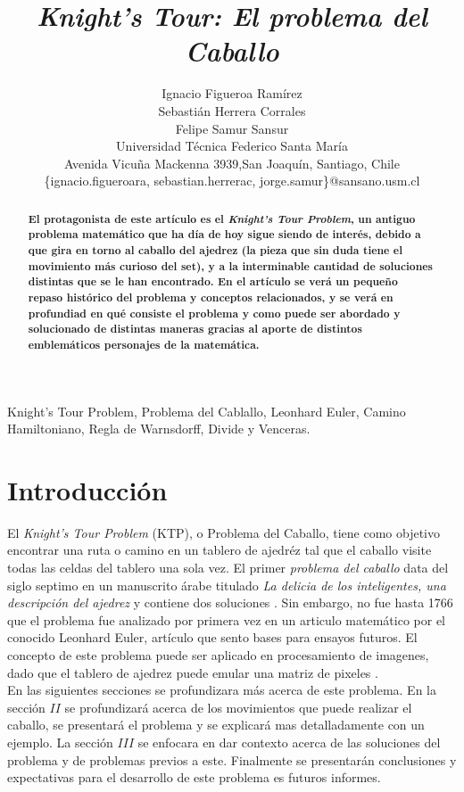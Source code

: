 \documentclass[journal, 10pt]{IEEEtran}
\begin{document}
\title{\textit{Knight's Tour:  El problema del Caballo}}
\author{Ignacio Figueroa Ram\'irez \\Sebasti\'an Herrera Corrales\\ Felipe Samur Sansur\\ Universidad T\'ecnica Federico Santa Mar\'ia \\ Avenida Vicu\~na Mackenna 3939,San Joaqu\'in, Santiago, Chile \\
\{ignacio.figueroara, sebastian.herrerac, jorge.samur\}@sansano.usm.cl}
\maketitle

\begin{abstract}
\textbf{El protagonista de este art\'iculo es el \textit{Knight's Tour Problem}, un antiguo problema matemático que ha día de hoy sigue siendo de interés, debido a que gira en torno al caballo del ajedrez (la pieza que sin duda tiene el movimiento más curioso del set), y a la interminable cantidad de soluciones distintas que se le han encontrado. En el artículo se verá un pequeño repaso histórico del problema y conceptos relacionados, y se verá en profundiad en qué consiste el problema y como puede ser abordado y solucionado de distintas maneras gracias al aporte de distintos emblemáticos personajes de la matemática. }
\end{abstract}

\begin{IEEEkeywords}
Knight's Tour Problem, Problema del Cablallo, Leonhard Euler, Camino Hamiltoniano, Regla de Warnsdorff, Divide y Venceras.
\end{IEEEkeywords}

\section{Introducci\'on}
El \textit{Knight's Tour Problem} (KTP), o Problema del Caballo, tiene como objetivo encontrar una ruta o camino en un tablero de ajedr\'ez tal que el caballo visite todas las celdas del tablero una sola vez.
El primer \textit{problema del caballo} data del siglo septimo en un manuscrito \'arabe titulado \textit{La delicia de los inteligentes, una descripci\'on del ajedrez} y contiene dos soluciones \cite{Murray:1913}. Sin embargo, no fue hasta 1766 que el problema fue analizado por primera vez en un articulo matem\'atico \cite{Euler:1759} por el conocido Leonhard Euler, art\'iculo que sento bases para ensayos futuros. El concepto de este problema puede ser aplicado en procesamiento de imagenes, dado que el tablero de ajedrez puede emular una matriz de pixeles \cite{Xiaoyong:2017}.\\
En las siguientes secciones se profundizara m\'as acerca de este problema. En la secci\'on $II$ se profundizar\'a acerca de los movimientos que puede realizar el caballo, se presentar\'a el problema y se explicar\'a mas detalladamente con un ejemplo. La secci\'on $III$ se enfocara en dar contexto acerca de las soluciones del problema y de problemas previos a este. Finalmente se presentar\'an conclusiones y expectativas para el desarrollo de este problema es futuros informes.
\end{document}

